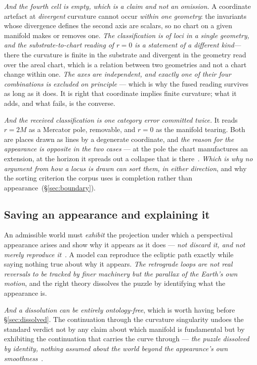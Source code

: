 \documentclass[11pt,a4paper]{article}
\theoremstyle{plain}
\theoremstyle{definition}
\begin{document}
\emph{And the fourth cell is empty, which is a claim and not an omission.} A coordinate artefact at
\emph{divergent} curvature cannot occur \emph{within one geometry}: the invariants whose divergence defines
the second axis are scalars, so no chart on a given manifold makes or removes one. \emph{The classification
is of loci in a single geometry, and the substrate-to-chart reading of $r=0$ is a statement of a different
kind}---there the curvature is finite in the substrate and divergent in the geometry read over the areal
chart, which is a relation between two geometries and not a chart change within one. \emph{The axes are independent, and exactly one of their four
combinations is excluded on principle} --- which is why the fused reading survives as long as it does. It is
right that coordinate implies finite curvature; what it adds, and what fails, is the converse.

\emph{And the received classification is one category error committed twice.} It reads $r=2M$ as a Mercator
pole, removable, and $r=0$ as the manifold tearing. Both are places drawn as lines by a degenerate
coordinate, and \emph{the reason for the appearance is opposite in the two cases} --- at the pole the chart
manufactures an extension, at the horizon it spreads out a collapse that is
there~\cite{JanzenCircle}. \emph{Which is why no argument from how a locus is drawn can sort them, in either
direction}, and why the sorting criterion the corpus uses is completion rather than
appearance~(\S\ref{sec:boundary}).

\subsection{Saving an appearance and explaining it}

An admissible world must \emph{exhibit} the projection under which a perspectival appearance arises and show
why it appears as it does --- \emph{not discard it, and not merely reproduce
it}~\cite{JanzenShadowExistence}. A model can reproduce the ecliptic path exactly while saying nothing true
about why it appears. \emph{The retrograde loops are not real reversals to be tracked by finer machinery but
the parallax of the Earth's own motion}, and the right theory dissolves the puzzle by identifying what the
appearance is.

\emph{And a dissolution can be entirely ontology-free}, which is worth having before \S\ref{sec:dissolved}.
The continuation through the curvature singularity undoes the standard verdict not by any claim about which
manifold is fundamental but by exhibiting the continuation that carries the curve through --- \emph{the puzzle
dissolved by identity, nothing assumed about the world beyond the appearance's own
smoothness}~\cite{JanzenCircle}.
\end{document}
